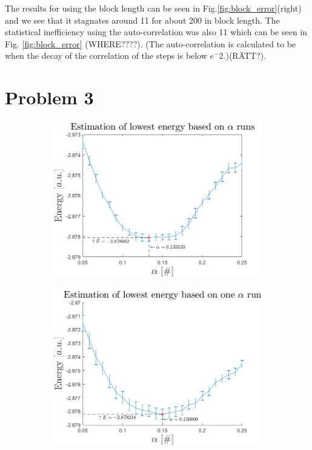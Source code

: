 The results for using the block length can be seen in Fig.\ref{fig:block_error}(right) and we see that it stagnates around 11 for about 200 in block length. The statistical inefficiency using the auto-correlation was also 11 which can be seen in Fig. \ref{fig:block_error} (WHERE????). (The auto-correlation is calculated to be when the decay of the correlation of the steps is below $e^-2$.)(RÄTT?).




\section*{Problem 3}


\begin{figure}[H]
	\centering
	\captionsetup[subfigure]{justification=centering}
	\begin{subfigure}[b]{0.48\textwidth}
		\centering
		\includegraphics[width=\textwidth]{graphics/task3/lowest_energy_indep_alpha.png}
	\end{subfigure}
	\begin{subfigure}[b]{0.48\textwidth}
		\centering
		\includegraphics[width=\textwidth]{graphics/task3/lowest_energy_one_alpha_run.png}

\end{subfigure}
\end{figure}
